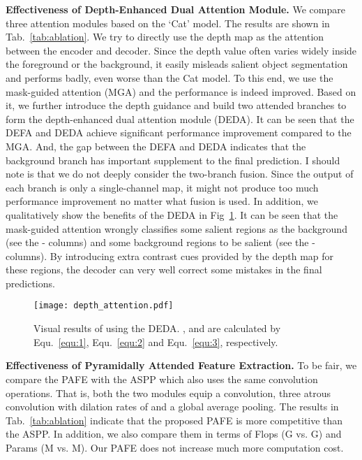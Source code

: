 \documentclass[runningheads]{llncs}
\begin{document}
\textbf{Effectiveness of Depth-Enhanced Dual Attention Module.} 
We compare three attention modules based on the `Cat' model. The results are shown in Tab.~\ref{tab:ablation}. We try to directly use the depth map as the attention between the encoder and decoder. Since the depth value often varies widely inside the foreground or the background, it easily misleads salient object segmentation and performs badly, even worse than the Cat model. To this end, we use the mask-guided attention (MGA) and the performance is indeed improved. Based on it, we further introduce the depth guidance and build two attended branches to form the depth-enhanced dual attention module (DEDA). It can be seen that the DEFA and DEDA achieve significant performance improvement compared to the MGA. And, the gap between the DEFA and DEDA indicates that the background branch has important supplement to the final prediction. I should note is that we do not deeply consider the two-branch fusion. Since the output of each branch is only a single-channel map, it might not produce too much performance improvement no matter what fusion is used.  
In addition, we qualitatively show the benefits of the DEDA in Fig~\ref{fig:DAM_visual}. It can be seen that the mask-guided attention wrongly classifies some salient regions as the background (see the  -  columns) and some background regions to be salient (see the  -  columns). By introducing extra contrast cues provided by the depth map for these regions, the decoder can very well correct some mistakes in the final predictions.
\begin{figure}[!ht]
  \centering
  \texttt{[image: depth\_attention.pdf]}
  \caption{Visual results of using the DEDA. ,  and  are calculated by Equ.~\ref{equ:1}, Equ.~\ref{equ:2} and Equ.~\ref{equ:3}, respectively. }
  \label{fig:DAM_visual}
  \end{figure}
  
\textbf{Effectiveness of Pyramidally Attended Feature Extraction.} To be fair, we compare the PAFE with the ASPP which also uses the same convolution operations. That is, both the two modules equip a  convolution, three  atrous convolution with dilation rates of  and a global average pooling. The results in Tab.~\ref{tab:ablation} indicate that the proposed PAFE is more competitive than the ASPP. In addition, we also compare them in terms of Flops (G vs. G) and Params (M vs. M). Our PAFE does not increase much more computation cost.
\end{document}
